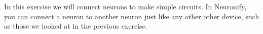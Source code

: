 \begin{Exercise}
In this exercise we will connect neurons to make simple circuits. In Neuronify, you can connect a neuron to another neuron just like any other other device, such as those we looked at in the previous exercise.
\end{Exercise}